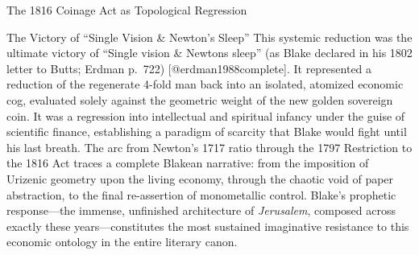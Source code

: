 \documentclass[
  ignorenonframetext,
]{beamer}
\begin{document}
\begin{frame}{The 1816 Coinage Act as Topological Regression}
\begin{block}{The Victory of ``Single Vision \& Newton's Sleep''}
\protect{}\label{the-victory-of-single-vision-newtons-sleep}
This systemic reduction was the ultimate victory of ``Single vision \&
Newtons sleep'' (as Blake declared in his 1802 letter to Butts; Erdman
p.~722) {[}@erdman1988complete{]}. It represented a reduction of the
regenerate 4-fold man back into an isolated, atomized economic cog,
evaluated solely against the geometric weight of the new golden
sovereign coin. It was a regression into intellectual and spiritual
infancy under the guise of scientific finance, establishing a paradigm
of scarcity that Blake would fight until his last breath. The arc from
Newton's 1717 ratio through the 1797 Restriction to the 1816 Act traces
a complete Blakean narrative: from the imposition of Urizenic geometry
upon the living economy, through the chaotic void of paper abstraction,
to the final re-assertion of monometallic control. Blake's prophetic
response---the immense, unfinished architecture of \emph{Jerusalem},
composed across exactly these years---constitutes the most sustained
imaginative resistance to this economic ontology in the entire literary
canon.
\end{block}
\end{frame}
\end{document}
